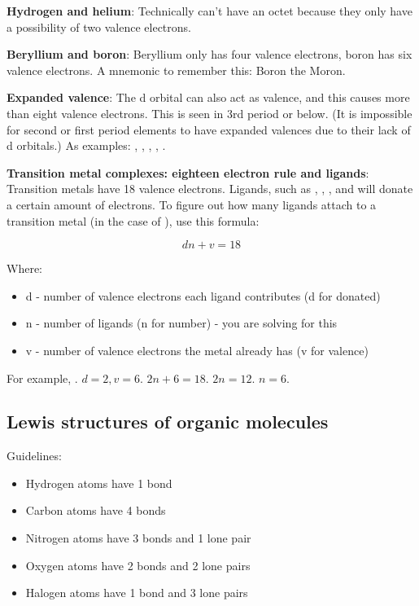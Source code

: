 \documentclass[letterpaper, 12pt]{article}
\begin{document}
	\textbf{Hydrogen and helium}: Technically can't have an octet because they only have a possibility of two valence electrons.
	
	\textbf{Beryllium and boron}: Beryllium only has four valence electrons, boron has six valence electrons. A mnemonic to remember this: Boron the Moron.
	
	\textbf{Expanded valence}: The d orbital can also act as valence, and this causes more than eight valence electrons. This is seen in 3rd period or below. (It is impossible for second or first period elements to have expanded valences due to their lack of d orbitals.) As examples: , , , , .
	
	\textbf{Transition metal complexes: eighteen electron rule and ligands}: Transition metals have 18 valence electrons. Ligands, such as , , , and  will donate a certain amount of electrons. To figure out how many ligands attach to a transition metal (in the case of ), use this formula:
	
	$$dn + v = 18$$
	
	Where:
	\begin{itemize}
		\item d - number of valence electrons each ligand contributes (d for donated)
		\item n - number of ligands (n for number) - you are solving for this
		\item v - number of valence electrons the metal already has (v for valence)
	\end{itemize}
	
	For example, . $d = 2, v = 6$. $2n + 6 = 18$. $2n = 12$. $n = 6$.
	
	\subsection{Lewis structures of organic molecules}
	Guidelines:
	\begin{itemize}
		\item Hydrogen atoms have 1 bond
		\item Carbon atoms have 4 bonds
		\item Nitrogen atoms have 3 bonds and 1  lone pair
		\item Oxygen atoms have 2 bonds and 2  lone pairs
		\item Halogen atoms have 1 bond and 3  lone pairs
	\end{itemize}
\clearpage
\end{document}
